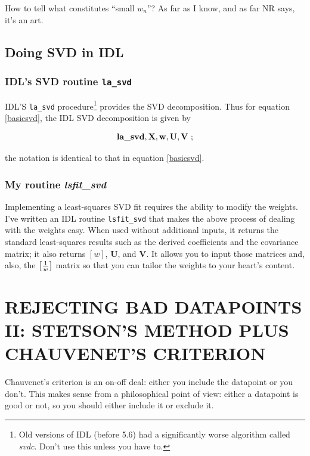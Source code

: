 \documentclass[psfig,preprint]{aastex}
\begin{document}
	How to tell what constitutes ``small $w_n$''? As far as I know,
and as far NR says, it's an art.

\subsection {Doing SVD in IDL} \label{svdandidl}
\subsubsection{IDL's SVD routine {\tt la\_svd}}

IDL'S \verb$la_svd$ procedure\footnote{Old versions of IDL (before 5.6)
had a significantly worse algorithm called {\it svdc}.  Don't use this
unless you have to.}  provides the SVD decomposition.  Thus for equation
\ref {basicsvd}, the IDL SVD decomposition is given by

\begin{equation}
{\bf la\_svd, X, w, U, V} \ ;
\end{equation}

\noindent the notation is identical to that in equation \ref {basicsvd}. 

\subsubsection{My routine {\it lsfit\_svd}} \label{myidl}

Implementing a least-squares SVD fit requires the ability to modify the
weights. I've written an IDL routine \verb$lsfit_svd$ that makes the
above process of dealing with the weights easy.  When used without
additional inputs, it returns the standard least-squares results such as
the derived coefficients and the covariance matrix; it also returns
$[w]$, $\mathbf {U}$, and $\mathbf {V}$. It allows you to input those
matrices and, also, the $\left[ 1 \over w \right]$ matrix so that you
can tailor the weights to your heart's content.

	\section{REJECTING BAD DATAPOINTS II: STETSON'S METHOD PLUS
CHAUVENET'S CRITERION}

\label{chauvenetsectiontwo}

	Chauvenet's criterion is an on-off deal: either you include the
datapoint or you don't. This makes sense from a philosophical point of view:
either a datapoint is good or not, so you should either include it or
exclude it. 
\end{document}

